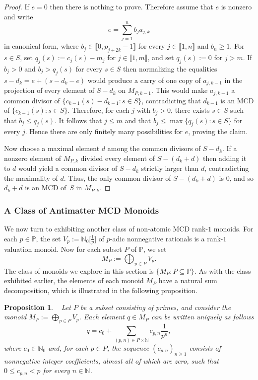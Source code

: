 \documentclass[10pt]{amsart}
\newtheorem{proposition}[theorem]{Proposition}
\theoremstyle{definition}
\theoremstyle{remark}
\numberwithin{equation}{section}
\newcommand{\nn}{\mathbb{N}}
\newcommand{\pp}{\mathbb{P}}
\providecommand\ldb{\llbracket}
\providecommand\rdb{\rrbracket}
\begin{document}
\begin{proof}
  If $e=0$ then there is nothing to prove. Therefore assume that $e$ is nonzero and write
  \[
    e = \sum_{j=1}^n b_j a_{j,k}
  \]
  in canonical form, where $b_j \in \ldb 0,p_{j+2k}-1\rdb$ for every $j \in \ldb 1,n\rdb$ and $b_n \ge 1$. For $s \in S$, set $q_j(s):=c_j(s)-m_j$ for $j \in \ldb 1,m\rdb$, and set $q_j(s):=0$ for $j>m$. If $b_j>0$ and $b_j>q_j(s)$ for every $s \in S$ then normalizing the equalities $s-d_k=e+(s-d_k-e)$ would produce a carry of one copy of $a_{j,k-1}$ in the projection of every element of $S-d_k$ on $M_{P,k-1}$. This would make $a_{j,k-1}$ a common divisor of $\{c_{k-1}(s)-d_{k-1} : s \in S\}$, contradicting that $d_{k-1}$ is an MCD of $\{c_{k-1}(s) : s \in S\}$. Therefore, for each $j$ with $b_j>0$, there exists $s \in S$ such that $b_j \le q_j(s)$. It follows that $j \le m$ and that $b_j \le \max\{q_j(s) : s \in S\}$ for every $j$. Hence there are only finitely many possibilities for $e$, proving the claim.

  Now choose a maximal element $d$ among the common divisors of $S-d_k$. If a nonzero element of $M_{P,k}$ divided every element of $S-(d_k+d)$ then adding it to $d$ would yield a common divisor of $S-d_k$ strictly larger than $d$, contradicting the maximality of $d$. Thus, the only common divisor of $S-(d_k+d)$ is $0$, and so $d_k+d$ is an MCD of~$S$ in $M_{P,k}$.
\end{proof}

\smallskip
\subsubsection{A Class of Antimatter MCD Monoids}

We now turn to exhibiting another class of non-atomic MCD rank-$1$ monoids. For each $p \in \pp$, the set $V_p := \nn_0\big[\frac1p\big]$ of $p$-adic nonnegative rationals is a rank-$1$ valuation monoid. Now for each subset $P$ of $\pp$, we set
\begin{equation} \label{eq:the GCD monoid M_P}
  M_P := \bigoplus_{p \in P} V_p.
\end{equation}
The class of monoids we explore in this section is $\{M_P : P \subseteq \pp \}$. As with the class exhibited earlier, the elements of each monoid $M_P$ have a natural sum decomposition, which is illustrated in the following proposition.

\begin{proposition}~\cite[Proposition 5.14]{CGGP25} \label{prop:canonical decomposition}
  Let $P$ be a subset consisting of primes, and consider the monoid $M_P := \bigoplus_{p \in P} V_p$. Each element $q \in M_P$ can be written uniquely as follows
  \begin{equation} \label{eq:canonical representation for internal sum of p-valuation}
    q = c_0 + \sum_{(p,n) \in P \times \nn} c_{p,n} \frac1{p^n},
  \end{equation}
  where $c_0 \in \nn_0$ and, for each $p \in P$, the sequence $(c_{p,n})_{n \ge 1}$ consists of nonnegative integer coefficients, almost all of which are zero, such that $0 \le c_{p,n} < p$ for every $n \in \nn$.
\end{proposition}
\end{document}
